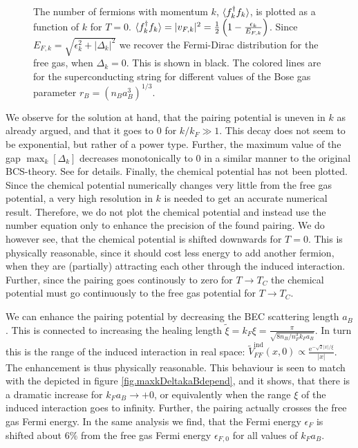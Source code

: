 \begin{figure} 
\begin{center}  
  
\caption{The number of fermions with momentum $k$, $\braket{f_k^\dagger f_k}$, is plotted as a function of $k$ for $T = 0$. $\braket{f_k^\dagger f_k} = |v_{F,k}|^2 = \frac{1}{2}\left(1 - \frac{\epsilon_k}{E_{F,k}}\right)$. Since $E_{F,k} = \sqrt{\epsilon_k^2 + |\Delta_k|^2}$ we recover the Fermi-Dirac distribution for the free gas, when $\Delta_k = 0$. This is shown in black. The colored lines are for the superconducting string for different values of the Bose gas parameter $r_B = (n_Ba_B^3)^{1/3}$.  }  
\label{fig.Occupancy}  
\end{center}    
\end{figure}

 We observe for the solution at hand, that the pairing potential is uneven in $k$ as already argued, and that it goes to 0 for $k/k_F \gg 1$. This decay does not seem to be exponential, but rather of a power type. Further, the maximum value of the gap $\max_k[\Delta_k]$ decreases monotonically to 0 in a similar manner to the original BCS-theory. See \cite{Tinkham,BruusFlensberg,PlischkeStatPhys} for details. Finally, the chemical potential has not been plotted. Since the chemical potential numerically changes very little from the free gas potential, a very high resolution in $k$ is needed to get an accurate numerical result. Therefore, we do not plot the chemical potential and instead use the number equation only to enhance the precision of the found pairing. We do however see, that the chemical potential is shifted downwards for $T=0$. This is physically reasonable, since it should cost less energy to add another fermion, when they are (partially) attracting each other through the induced interaction. Further, since the pairing goes continously to zero for $T\to T_C$ the chemical potential must go continuously to the free gas potential for $T\to T_C$. 

 We can enhance the pairing potential by decreasing the BEC scattering length $a_B$. This is connected to increasing the healing length $\tilde{\xi} = k_F\xi = \frac{\pi}{\sqrt{8 n_B/n_F^3 k_Fa_B}}$. In turn this is the range of the induced interaction in real space: $\tilde{V}_{FF}^\text{ind}(x,0) \propto \frac{\text{e}^{-\sqrt{2}|x|/\xi}}{|x|}$. The enhancement is thus physically reasonable. This behaviour is seen to match with the depicted in figure \ref{fig.maxkDeltakaBdepend}, and it shows, that there is a dramatic increase for $k_Fa_B \to +0$, or equivalently when the range $\xi$ of the induced interaction goes to infinity. Further, the pairing actually crosses the free gas Fermi energy. In the same analysis we find, that the Fermi energy $\epsilon_F$ is shifted about $6\%$ from the free gas Fermi energy $\epsilon_{F,0}$ for all values of $k_F a_B$.  


